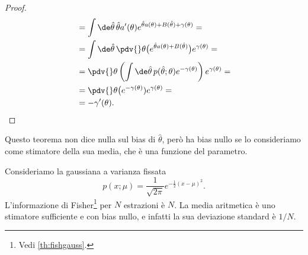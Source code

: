 \begin{proof}
\begin{align*}
		&= \int\de\hat\theta\, \hat\theta a'(\theta) e^{\hat\theta a(\theta)+B(\hat\theta)+\gamma(\theta)} = \\
		&= \int\de\hat\theta\, \pdv{}\theta \big(e^{\hat\theta a(\theta)+B(\hat\theta)}\big) e^{\gamma(\theta)} = \\
		&= \pdv{}\theta \left( \int\de\hat\theta\, p(\hat\theta;\theta) e^{-\gamma(\theta)} \right) e^{\gamma(\theta)} = \\
		&= \pdv{}\theta \big(e^{-\gamma(\theta)})e^{\gamma(\theta)} = \\
		&= -\gamma'(\theta). \qedhere
	\end{align*}
\end{proof}

Questo teorema non dice nulla sul bias di $\hat\theta$,
però ha bias nullo se lo consideriamo come stimatore della sua media,
che è una funzione del parametro.

\begin{example}
	Consideriamo la gaussiana a varianza fissata
	\begin{equation*}
		p(x;\mu)
		= \frac1{\sqrt{2\pi}} e^{-\frac12 (x-\mu)^2}.
	\end{equation*}
	L'informazione di Fisher\footnote{Vedi \autoref{th:fishgauss}.} per $N$ estrazioni è $N$.
	La media aritmetica è uno stimatore sufficiente e con bias nullo,
	e infatti la sua deviazione standard è $1/N$.
\end{example}

